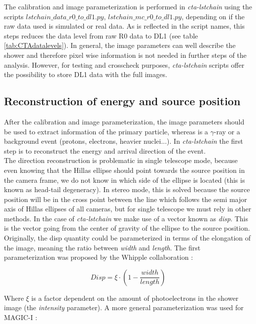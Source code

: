 \documentclass[main.tex]{subfiles}
\begin{document}
The calibration and image parameterization is performed in \textit{cta-lstchain} using the scripts \textit{$lstchain\_data\_r0\_to\_dl1.py$}, \textit{$lstchain\_mc\_r0\_to\_dl1.py$}, depending on if the raw data used is simulated or real data. As is reflected in the script names, this steps reduces the data level from raw R0 data to DL1 (see table \ref{tab:CTAdatalevels}). In general, the image parameters can well describe the shower and therefore pixel wise information is not needed in further steps of the analysis. However, for testing and crosscheck purposes, \textit{cta-lstchain} scripts offer the possibility to store DL1 data with the full images.


\subsection{Reconstruction of energy and source position} \label{sec:recoe}

After the calibration and image parameterization, the image parameters should be used to extract information of the primary particle, whereas is a $\gamma$-ray or a background event (protons, electrons, heavier nuclei...). In \textit{cta-lstchain} the first step is to reconstruct the energy and arrival direction of the event.\\ 
The direction reconstruction is problematic in single telescope mode, because even knowing that the Hillas ellipse should point towards the source position in the camera frame, we do not know in which side of the ellipse is located (this is known as head-tail degeneracy). In stereo mode, this is solved because the source position will be in the cross point between the line which follows the semi major axis of Hillas ellipses of all cameras, but for single telescope we must rely in other methods. In the case of \textit{cta-lstchain} we make use of a vector known as \textit{disp}. This is the vector going from the center of gravity of the ellipse to the source position.\\
Originally, the disp quantity could be parameterized in terms of the elongation of the image, meaning the ratio between \textit{width} and \textit{length}. The first parameterization was proposed by the Whipple collaboration \cite{1994dispwhipple}:

\begin{equation}
  Disp = \xi \cdot \left(1 - \frac{width}{length}  \right)
\end{equation}

Where $\xi$ is a factor dependent on the amount of photoelectrons in the shower image (the \textit{intensity} parameter). A more general parameterization was used for MAGIC-I \cite{2005DISPmagic}:
\end{document}
